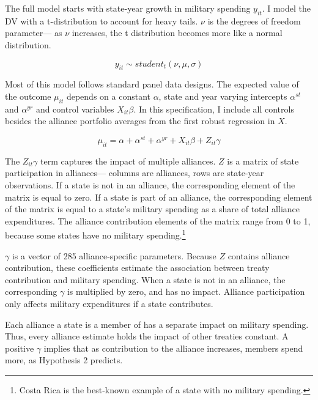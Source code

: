 \documentclass[12pt]{article}
\begin{document}
The full model starts with state-year growth in military spending $y_{it}$.
I model the DV with a t-distribution to account for heavy tails.
$\nu$ is the degrees of freedom parameter--- as $\nu$ increases, the t distribution becomes more like a normal distribution. 


\begin{equation}
y_{it} \sim student_t(\nu, \mu, \sigma) 
\end{equation}


Most of this model follows standard panel data designs.
The expected value of the outcome $\mu_{it}$ depends on a constant $\alpha$, state and year varying intercepts $\alpha^{st}$ and $\alpha^{yr}$ and control variables $X_{it} \beta$. 
In this specification, I include all controls besides the alliance portfolio averages from the first robust regression in $X$.


\begin{equation}
\mu_{it} = \alpha + \alpha^{st} + \alpha^{yr} + X_{it} \beta + Z_{it} \gamma 
\end{equation}


The $Z_{it} \gamma$ term captures the impact of multiple alliances. 
\textbf{$Z$} is a matrix of state participation in alliances--- columns are alliances, rows are state-year observations. 
If a state is not in an alliance, the corresponding element of the matrix is equal to zero. 
If a state is part of an alliance, the corresponding element of the matrix is equal to a state's military spending as a share of total alliance expenditures. 
The alliance contribution elements of the matrix range from 0 to 1, because some states have no military spending.\footnote{Costa Rica is the best-known example of a state with no military spending.} 


$\gamma$ is a vector of 285 alliance-specific parameters.  
Because $Z$ contains alliance contribution, these coefficients estimate the association between treaty contribution and military spending. 
When a state is not in an alliance, the corresponding $\gamma$ is multiplied by zero, and has no impact. 
Alliance participation only affects military expenditures if a state contributes. 


Each alliance a state is a member of has a separate impact on military spending.
Thus, every alliance estimate holds the impact of other treaties constant. 
A positive $\gamma$ implies that as contribution to the alliance increases, members spend more, as Hypothesis 2 predicts. 
    
\end{document}
